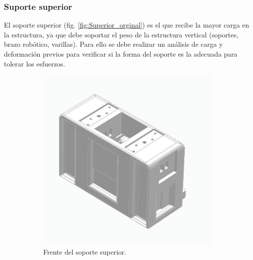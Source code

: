 \subsubsection{Suporte superior}
El soporte superior (fig. \ref{fig:Superior_orginal}) es el que recibe la mayor carga en la estructura, ya que debe soportar el peso de la estructura vertical (soportes, brazo robótico, varillas). Para ello se debe realizar un análisis de carga y deformación previos para verificar si la forma del soporte es la adecuada para tolerar los esfuerzos.
\begin{figure}[H]
    \centering
    \begin{subfigure}[b]{0.45\textwidth}
        \centering
        \includegraphics[width=\textwidth]{img/Superior_frente.jpg}
        \caption{Frente del soporte superior.}
        \label{fig:izaje_desacoplado}
    \end{subfigure}
    \hspace{0.02\textwidth}
    \begin{subfigure}[b]{0.45\textwidth}
        \centering

\end{subfigure}
\end{figure}
